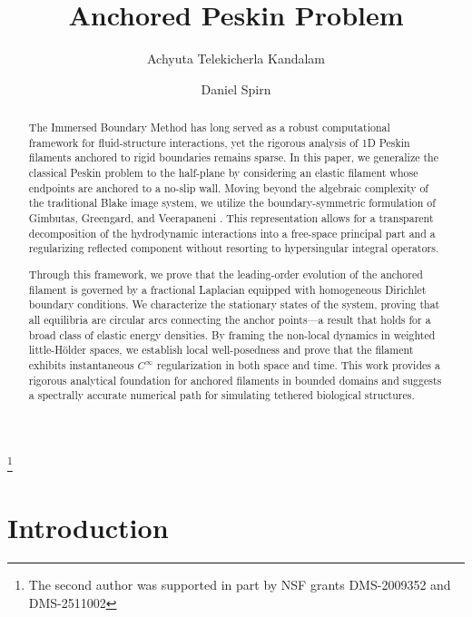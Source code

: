 \documentclass{amsart}
\begin{document}
\title{Anchored Peskin Problem}
\author{Achyuta Telekicherla Kandalam}
\address{School of Mathematics, University of Minnesota, Minneapolis, MN 55455}

\author{Daniel Spirn}
\address{School of Mathematics, University of Minnesota, Minneapolis, MN 55455}

\thanks{The second author was supported in part by NSF grants DMS-2009352 and DMS-2511002}

\maketitle

\begin{abstract}
The Immersed Boundary Method has long served as a robust computational framework for fluid-structure interactions, yet the rigorous analysis of 1D Peskin filaments anchored to rigid boundaries remains sparse. In this paper, we generalize the classical Peskin problem to the half-plane by considering an elastic filament whose endpoints are  anchored to a no-slip wall. Moving beyond the algebraic complexity of the traditional Blake image system, we utilize the boundary-symmetric formulation of Gimbutas, Greengard, and Veerapaneni \cite{gimbutas2015simple}. This  representation allows for a transparent decomposition of the hydrodynamic interactions into a free-space principal part and a regularizing reflected component without resorting to hypersingular integral operators. 

Through this framework, we prove that the leading-order evolution of the anchored filament is governed by a fractional Laplacian equipped with homogeneous Dirichlet boundary conditions. We characterize the stationary states of the system, proving that all equilibria are circular arcs connecting the anchor points—a result that holds for a broad class of elastic energy densities. By framing the non-local dynamics in weighted little-H\"{o}lder spaces, we establish local well-posedness and prove that the filament exhibits instantaneous $C^\infty$ regularization in both space and time. This work provides a rigorous analytical foundation for anchored filaments in bounded domains and suggests a spectrally accurate numerical path for simulating tethered biological structures.
\end{abstract}


\section{Introduction}
\end{document}
